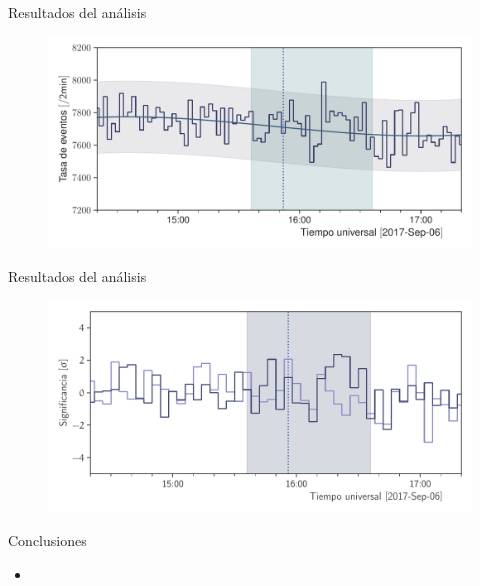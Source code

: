 \documentclass[spanish,aspectratio=169]{beamer}
\begin{document}
\begin{frame}{Resultados del análisis}

\begin{figure}
        \centering
        \includegraphics[width=\textwidth]{neutron-170906.pdf}
\end{figure}

\end{frame}


\begin{frame}{Resultados del análisis}

\begin{figure}
        \centering
        \includegraphics[width=\textwidth]{significance-170906.pdf}
\end{figure}

\end{frame}

\begin{frame}{Conclusiones}

\begin{block}{}

\begin{itemize}
	\item
\end{itemize}

\end{block}

\end{frame}
\end{document}
